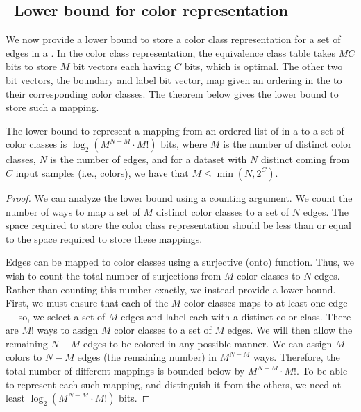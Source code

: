 \subsection{~Lower bound for color representation}


We now provide a lower bound to store a color class representation for a set of
edges in a \cdbg. In the color class representation, the equivalence class table
takes $MC$ bits to store $M$ bit vectors each having $C$ bits, which is
optimal. The other two bit vectors, the boundary and label bit vector, map \kmers
given an ordering in the \dbg to their corresponding color classes. The theorem
below gives the lower bound to store such a mapping.
 
\begin{theorem}
%
  The lower bound to represent a mapping from an ordered list of \kmers in a
  \dbg to a set of color classes is $\log_2{(M^{N-M} \cdot M!)}$ bits, where
  $M$ is the number of distinct color classes, $N$ is the number of edges, and
  for a dataset with $N$ distinct \kmers coming from $C$ input samples (i.e.,
  colors), we have that $M \leq \min(N,2^C)$.
%
\end{theorem}

\begin{proof}

We can analyze the lower bound using a counting argument. We count the number
of ways to map a set of $M$ distinct color classes to a set of $N$ edges. The
space required to store the color class representation should be less than or
equal to the space required to store these mappings.

Edges can be mapped to color classes using a surjective (onto) function. Thus,
we wish to count the total number of surjections from $M$ color classes to $N$
edges. Rather than counting this number exactly, we instead provide a lower bound.
First, we must ensure that each of the $M$ color classes maps to at least one
edge --- so, we select a set of $M$ edges and label each with a distinct color
class. There are $M!$ ways to assign $M$ color classes to a set of $M$ edges. We
will then allow the remaining $N-M$ edges to be colored in any possible manner.
We can assign $M$ colors to $N-M$ edges (the remaining number) in $M^{N-M}$
ways. Therefore, the total number of different mappings is bounded below by $M^{N-M}
\cdot M!$. To be able to represent each such mapping, and distinguish it from
the others, we need at least $\log_2{(M^{N-M} \cdot M!)}$ bits.
\end{proof}

